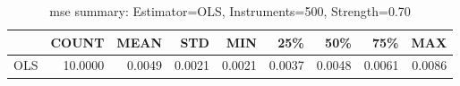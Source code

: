 \begin{table}[ht]
\centering
\caption{mse summary: Estimator=OLS, Instruments=500, Strength=0.70}
\begin{tabular}{lrrrrrrrr}
\toprule
 & COUNT & MEAN & STD & MIN & 25\% & 50\% & 75\% & MAX \\
\midrule
OLS & 10.0000 & 0.0049 & 0.0021 & 0.0021 & 0.0037 & 0.0048 & 0.0061 & 0.0086 \\
\bottomrule
\end{tabular}
\end{table}
